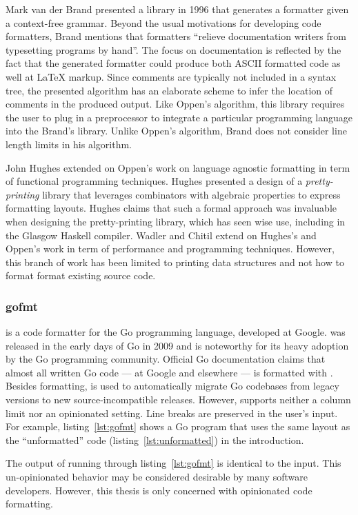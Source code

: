 Mark van der Brand presented a library in 1996 that generates a formatter given a context-free grammar\autocite{van_den_brand_generation_1996}.
Beyond the usual motivations for developing code formatters, Brand mentions that formatters ``relieve documentation writers from typesetting programs by hand''.
The focus on documentation is reflected by the fact that the generated formatter could produce both ASCII formatted code as well at \LaTeX{} markup.
Since comments are typically not included in a syntax tree, the presented algorithm has an elaborate scheme to infer the location of comments in the produced output.
Like Oppen's algorithm, this library requires the user to plug in a preprocessor to integrate a particular programming language into the Brand's library.
Unlike Oppen's algorithm, Brand does not consider line length limits in his algorithm.

John Hughes extended on Oppen's work on language agnostic formatting in term of functional programming techniques\autocite{hughes_design_1995}.
Hughes presented a design of a \emph{pretty-printing} library that leverages combinators with algebraic properties to express formatting layouts.
Hughes claims that such a formal approach was invaluable when designing the pretty-printing library, which has seen wise use, including in the Glasgow Haskell compiler.
Wadler\autocite{wadler_prettier_2003} and Chitil\autocite{swierstra_linear_2009} extend on Hughes's and Oppen's work in term of performance and programming techniques.
However, this branch of work has been limited to printing data structures and not how to format format existing source code.

\subsubsection{gofmt}
\gofmt\autocite{gofmt94:online} is a code formatter for the Go programming language, developed at Google.
\gofmt{} was released in the early days of Go in 2009 and is noteworthy for its heavy adoption by the Go programming community.
Official Go documentation\autocite{CodeR59:online} claims that almost all written Go code --- at Google and elsewhere --- is formatted with \gofmt{}.
Besides formatting, \gofmt{} is used to automatically migrate Go codebases from legacy versions to new source-incompatible releases.
However, \gofmt{} supports neither a column limit nor an opinionated setting.
Line breaks are preserved in the user's input.
For example, listing~\ref{lst:gofmt} shows a Go program that uses the same layout as the ``unformatted'' code (listing~\ref{lst:unformatted}) in the introduction.

The output of running \gofmt{} through listing~\ref{lst:gofmt} is identical to the input.
This un-opinionated behavior may be considered desirable by many software developers.
However, this thesis is only concerned with opinionated code formatting.

